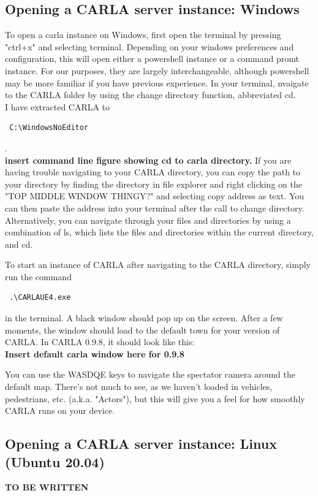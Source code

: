 \documentclass{article}
\begin{document}
\subsection{Opening a CARLA server instance: Windows}
\label{sec:CARLAserverwindows}
To open a carla instance on Windows, first open the terminal by pressing "ctrl+x" and selecting terminal. Depending on your windows preferences and configuration, this will open either a powershell instance or a command promt instance. For our purposes, they are largely interchangeable, although powershell may be more familiar if you have previous experience. In your terminal, nvaigate to the CARLA folder by using the change directory function, abbreviated cd. 
\\
I have extracted CARLA to \begin{verbatim} C:\WindowsNoEditor \end{verbatim}.
\\
 \textbf{insert command line figure showing cd to carla directory.}
If you are having trouble navigating to your CARLA directory, you can copy the path to your directory by finding the directory in file explorer and  right clicking on the "TOP MIDDLE WINDOW THINGY?" and selecting copy address as text. You can then paste the address into your terminal after the call to change directory.
Alternatively, you can navigate through your files and directories by using a combination of ls, which lists the files and directories within the current directory, and cd. 

To start an instance of CARLA after navigating to the CARLA directory, simply run the command \begin{verbatim} .\CARLAUE4.exe \end{verbatim} in the terminal. A black window should pop up on the screen. After a few moments, the window should load to the default town for your version of CARLA. In CARLA 0.9.8, it should look like this:
\\ 
\textbf{Insert default carla window here for 0.9.8}

You can use the WASDQE keys to navigate the spectator camera around the default map. There's not much to see, as we haven't loaded in vehicles, pedestrians, etc. (a.k.a. "Actors"), but this will give you a feel for how smoothly CARLA runs on your device.
\subsection{Opening a CARLA server instance: Linux (Ubuntu 20.04)}
 \textbf{TO BE WRITTEN}
\end{document}
